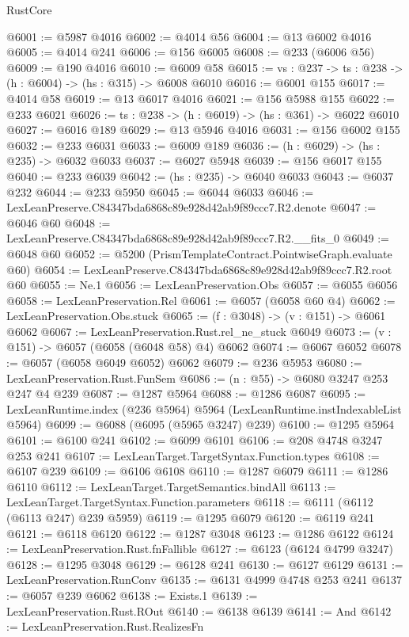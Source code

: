 \begin{lexlean}{RustCore}
\begin{coremodule}
@6001 := @5987 @4016
@6002 := @4014 @56
@6004 := @13 @6002 @4016
@6005 := @4014 @241
@6006 := @156 @6005
@6008 := @233 (@6006 @56)
@6009 := @190 @4016
@6010 := @6009 @58
@6015 := {vs : @237} -> {ts : @238} -> (h : @6004) -> (hs : @315) -> @6008 @6010
@6016 := @6001 @155
@6017 := @4014 @58
@6019 := @13 @6017 @4016
@6021 := @156 @5988 @155
@6022 := @233 @6021
@6026 := {ts : @238} -> (h : @6019) -> (hs : @361) -> @6022 @6010
@6027 := @6016 @189
@6029 := @13 @5946 @4016
@6031 := @156 @6002 @155
@6032 := @233 @6031
@6033 := @6009 @189
@6036 := (h : @6029) -> (hs : @235) -> @6032 @6033
@6037 := @6027 @5948
@6039 := @156 @6017 @155
@6040 := @233 @6039
@6042 := (hs : @235) -> @6040 @6033
@6043 := @6037 @232
@6044 := @233 @5950
@6045 := @6044 @6033
@6046 := LexLeanPreserve.C84347bda6868c89e928d42ab9f89ccc7.R2.denote
@6047 := @6046 @60
@6048 := LexLeanPreserve.C84347bda6868c89e928d42ab9f89ccc7.R2.__fits_0
@6049 := @6048 @60
@6052 := @5200 (PrismTemplateContract.PointwiseGraph.evaluate @60)
@6054 := LexLeanPreserve.C84347bda6868c89e928d42ab9f89ccc7.R2.root @60
@6055 := Ne.{1}
@6056 := LexLeanPreservation.Obs
@6057 := @6055 @6056
@6058 := LexLeanPreservation.Rel
@6061 := @6057 (@6058 @60 @4)
@6062 := LexLeanPreservation.Obs.stuck
@6065 := (f : @3048) -> (v : @151) -> @6061 @6062
@6067 := LexLeanPreservation.Rust.rel_ne_stuck @6049
@6073 := (v : @151) -> @6057 (@6058 (@6048 @58) @4) @6062
@6074 := @6067 @6052
@6078 := @6057 (@6058 @6049 @6052) @6062
@6079 := @236 @5953
@6080 := LexLeanPreservation.Rust.FunSem
@6086 := (n : @55) -> @6080 @3247 @253 @247 @4 @239
@6087 := @1287 @5964
@6088 := @1286 @6087
@6095 := LexLeanRuntime.index (@236 @5964) @5964 (LexLeanRuntime.instIndexableList @5964)
@6099 := @6088 (@6095 (@5965 @3247) @239)
@6100 := @1295 @5964
@6101 := @6100 @241
@6102 := @6099 @6101
@6106 := @208 @4748 @3247 @253 @241
@6107 := LexLeanTarget.TargetSyntax.Function.types
@6108 := @6107 @239
@6109 := @6106 @6108
@6110 := @1287 @6079
@6111 := @1286 @6110
@6112 := LexLeanTarget.TargetSemantics.bindAll
@6113 := LexLeanTarget.TargetSyntax.Function.parameters
@6118 := @6111 (@6112 (@6113 @247) @239 @5959)
@6119 := @1295 @6079
@6120 := @6119 @241
@6121 := @6118 @6120
@6122 := @1287 @3048
@6123 := @1286 @6122
@6124 := LexLeanPreservation.Rust.fnFallible
@6127 := @6123 (@6124 @4799 @3247)
@6128 := @1295 @3048
@6129 := @6128 @241
@6130 := @6127 @6129
@6131 := LexLeanPreservation.RunConv
@6135 := @6131 @4999 @4748 @253 @241
@6137 := @6057 @239 @6062
@6138 := Exists.{1}
@6139 := LexLeanPreservation.Rust.ROut
@6140 := @6138 @6139
@6141 := And
@6142 := LexLeanPreservation.Rust.RealizesFn

\end{coremodule}
\end{lexlean}
